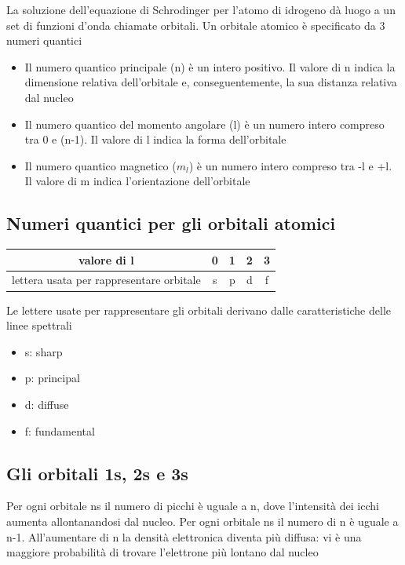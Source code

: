 \documentclass[a4paper,11pt]{report}
\begin{document}
La soluzione dell'equazione di Schrodinger per l'atomo di idrogeno dà luogo a un set di funzioni d'onda chiamate orbitali. 
Un orbitale atomico è specificato da 3 numeri quantici
\begin{itemize}
	\item Il numero quantico principale (n) è un intero positivo. Il valore di n indica la dimensione relativa dell'orbitale e, conseguentemente, la sua distanza relativa dal nucleo
	\item Il numero quantico del momento angolare (l) è un numero intero compreso tra 0 e (n-1). Il valore di l indica la forma dell'orbitale
	\item Il numero quantico magnetico ($m_l$) è un numero intero compreso tra -l e +l. Il valore di m indica l'orientazione dell'orbitale
\end{itemize}

\subsection*{Numeri quantici per gli orbitali atomici}

\begin{center}
\begin{tabular}{|c|c|c|c|c|}
	\hline
	valore di l & 0&1&2&3 \\
	\hline
	lettera usata per rappresentare orbitale &s&p&d&f \\
	\hline
\end{tabular} 
\end{center}

\noindent Le lettere usate per rappresentare gli orbitali derivano dalle caratteristiche delle linee spettrali

\begin{itemize}
	\item s: sharp
	\item p: principal
	\item d: diffuse
	\item f: fundamental
\end{itemize}

\subsection*{Gli orbitali 1s, 2s e 3s}

Per ogni orbitale ns il numero di picchi è uguale a n, dove l'intensità dei icchi aumenta allontanandosi dal nucleo.
Per ogni orbitale ns il numero di n è uguale a n-1.
All'aumentare di n la densità elettronica diventa più diffusa: vi è una maggiore probabilità di trovare l'elettrone più lontano dal nucleo
\end{document}
